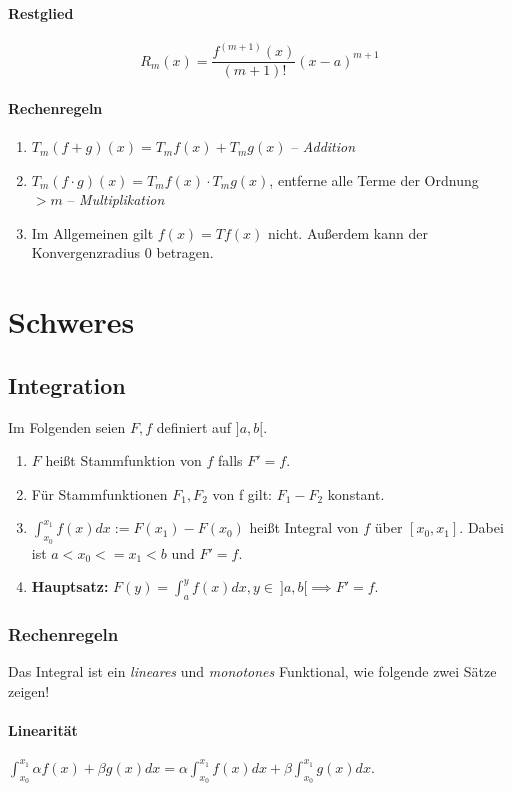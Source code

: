 \documentclass[a4paper, 9pt, DIV=24]{scrartcl}
\begin{document}
\paragraph{Restglied}

\[ R_{m}(x) = \frac{f^{(m+1)}(x)}{(m+1)!}(x-a)^{m+1} \]

\paragraph{Rechenregeln}
\begin{enumerate}[label={(}\arabic*{)}]
 \item $T_m(f+g)(x) = T_m f(x) + T_m g(x)$ -- \emph{Addition}
 \item $T_m(f\cdot g)(x) = T_m f(x) \cdot T_m g(x)$, entferne alle Terme der Ordnung $> m$ -- \emph{Multiplikation}
 \item Im Allgemeinen gilt $f(x) = T f(x)$ nicht. Außerdem kann der Konvergenzradius $0$ betragen.
\end{enumerate}

\clearpage
\section{Schweres}

\subsection{Integration}
Im Folgenden seien $F, f$ definiert auf $]a,b[$.
\begin{enumerate}[label={(}\arabic*{)}]
 \item $F$ heißt Stammfunktion von $f$ falls $F' = f$.
 \item Für Stammfunktionen $F_1, F_2$ von f gilt: $F_1 - F_2$ konstant.
 \item $\int_{x_0}^{x_1}f(x)dx := F(x_1) - F(x_0)$ heißt Integral von $f$ über $[x_0, x_1]$.
   Dabei ist $a < x_0 <= x_1 < b$ und $F' = f$.
 \item \textbf{Hauptsatz:} $F(y) = \int_{a}^{y}f(x)dx, y \in\ ]a,b[ \implies F' = f.$
\end{enumerate}

\subsubsection{Rechenregeln}
Das Integral ist ein \emph{lineares} und \emph{monotones} Funktional, wie folgende zwei Sätze zeigen!
\paragraph{Linearität}
$\int_{x_0}^{x_1}\alpha f(x) + \beta g(x) dx = \alpha\int_{x_0}^{x_1}f(x)dx + \beta\int_{x_0}^{x_1}g(x)dx.$
\end{document}

